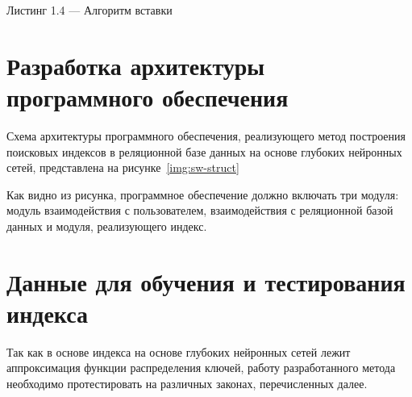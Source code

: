 \noindent\parbox[t]{\linewidth}{
Листинг 1.4 --- Алгоритм вставки
}
\begin{algorithm}[H]
    \label{alg:insert}
    \small


\end{algorithm}

\section{Разработка архитектуры программного обеспечения}

Схема архитектуры программного обеспечения, реализующего метод построения
поисковых индексов в реляционной базе данных на основе глубоких нейронных сетей,
представлена на рисунке~\ref{img:sw-struct}


Как видно из рисунка, программное обеспечение должно включать три модуля:
модуль взаимодействия с пользователем, взаимодействия с реляционной базой данных и
модуля, реализующего индекс.


\section{Данные для обучения и тестирования индекса\label{data}}

Так как в основе индекса на основе глубоких нейронных сетей лежит аппроксимация
функции распределения ключей, работу разработанного метода необходимо
протестировать на различных законах, перечисленных далее.

